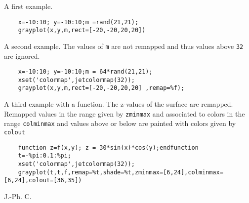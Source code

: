 \begin{examples}

\noindent A first example.
  \begin{Verbatim}
    x=-10:10; y=-10:10;m =rand(21,21);
    grayplot(x,y,m,rect=[-20,-20,20,20])
  \end{Verbatim}

\noindent A second example. The values of \verb!m! are not remapped and
thus values above \verb!32! are ignored.

  \begin{Verbatim}
    x=-10:10; y=-10:10;m = 64*rand(21,21);
    xset('colormap',jetcolormap(32));
    grayplot(x,y,m,rect=[-20,-20,20,20] ,remap=%f);
  \end{Verbatim}

\noindent A third example with a function. The z-values of the surface are remapped.
Remapped values in the range given by \verb!zminmax! and associated to colors in the range
\verb!colminmax! and values above or below are painted with colors given by \verb!colout!

  \begin{Verbatim}
    function z=f(x,y); z = 30*sin(x)*cos(y);endfunction
    t=-%pi:0.1:%pi;
    xset('colormap',jetcolormap(32));
    grayplot(t,t,f,remap=%t,shade=%t,zminmax=[6,24],colminmax=[6,24],colout=[36,35])
  \end{Verbatim}
\end{examples}

\begin{manseealso}
     
\end{manseealso}


\begin{authors}
  J.-Ph. C.
\end{authors}
